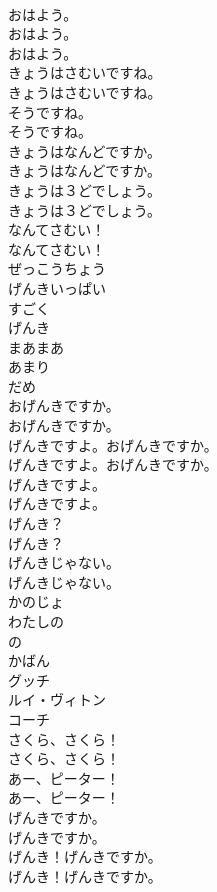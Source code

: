 \documentclass[8pt]{extreport}
\begin{document}
\begin{CJK}{UTF8}{min}
\\	おはよう。 
\\	おはよう。	
\\	おはよう。 
\\	きょうはさむいですね。	
\\	きょうはさむいですね。 
\\	そうですね。	
\\	そうですね。 
\\	きょうはなんどですか。	
\\	きょうはなんどですか。 
\\	きょうは３どでしょう。	
\\	きょうは３どでしょう。 
\\	なんてさむい！	
\\	なんてさむい！ 
\\	ぜっこうちょう
\\	げんきいっぱい
\\	すごく
\\	げんき
\\	まあまあ
\\	あまり
\\	だめ
\\	おげんきですか。	
\\	おげんきですか。 
\\	げんきですよ。おげんきですか。	
\\	げんきですよ。おげんきですか。 
\\	げんきですよ。	
\\	げんきですよ。 
\\	げんき？	
\\	げんき？ 
\\	げんきじゃない。	
\\	げんきじゃない。 
\\	かのじょ
\\	わたしの
\\	の
\\	かばん
\\	グッチ
\\	ルイ・ヴィトン
\\	コーチ
\\	さくら、さくら！	
\\	さくら、さくら！ 
\\	あー、ピーター！	
\\	あー、ピーター！ 
\\	げんきですか。	
\\	げんきですか。 
\\	げんき！げんきですか。	
\\	げんき！げんきですか。 

\end{CJK}
\end{document}
